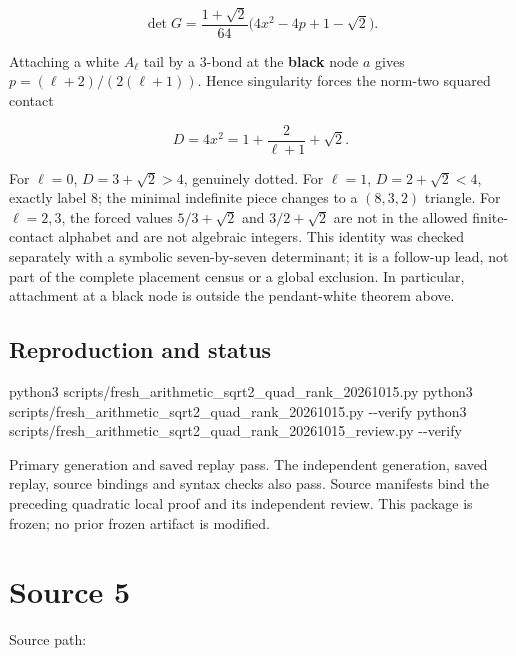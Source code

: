 \documentclass[
  10pt,
]{report}
\newenvironment{Shaded}{}{}
\newcommand{\AttributeTok}[1]{\textcolor[rgb]{0.49,0.56,0.16}{#1}}
\newcommand{\ExtensionTok}[1]{#1}
\newcommand{\NormalTok}[1]{#1}
\begin{document}
\[
\det G=\frac{1+\sqrt2}{64}
\bigl(4x^2-4p+1-\sqrt2\bigr).
\]

Attaching a white \(A_\ell\) tail by a 3-bond at the \textbf{black} node
\(a\) gives \(p=(\ell+2)/(2(\ell+1))\). Hence singularity forces the
norm-two squared contact

\[
D=4x^2=1+\frac{2}{\ell+1}+\sqrt2.
\]

For \(\ell=0\), \(D=3+\sqrt2>4\), genuinely dotted. For \(\ell=1\),
\(D=2+\sqrt2<4\), exactly label 8; the minimal indefinite piece changes
to a \((8,3,2)\) triangle. For \(\ell=2,3\), the forced values
\(5/3+\sqrt2\) and \(3/2+\sqrt2\) are not in the allowed finite-contact
alphabet and are not algebraic integers. This identity was checked
separately with a symbolic seven-by-seven determinant; it is a follow-up
lead, not part of the complete placement census or a global exclusion.
In particular, attachment at a black node is outside the pendant-white
theorem above.

\section{Reproduction and status}\label{reproduction-and-status}

\begin{Shaded}
\begin{Highlighting}[]
\ExtensionTok{python3}\NormalTok{ scripts/fresh\_arithmetic\_sqrt2\_quad\_rank\_20261015.py}
\ExtensionTok{python3}\NormalTok{ scripts/fresh\_arithmetic\_sqrt2\_quad\_rank\_20261015.py }\AttributeTok{{-}{-}verify}
\ExtensionTok{python3}\NormalTok{ scripts/fresh\_arithmetic\_sqrt2\_quad\_rank\_20261015\_review.py }\AttributeTok{{-}{-}verify}
\end{Highlighting}
\end{Shaded}

Primary generation and saved replay pass. The independent generation,
saved replay, source bindings and syntax checks also pass. Source
manifests bind the preceding quadratic local proof and its independent
review. This package is frozen; no prior frozen artifact is modified.

\clearpage

\chapter{Source 5}\label{source-5}

Source path: 
\end{document}

